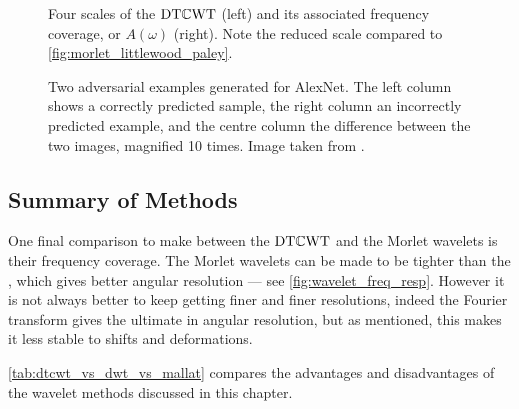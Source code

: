   \begin{figure}
    \subfloat{\makebox[0.6\textwidth][c]{%
    }}
    \subfloat{\makebox[0.4\textwidth][c]{%
    }}
    \caption[$\DTCWT$ basis functions and their frequency coverage]
    {Four scales of the $\DTCWT$ (left) and its associated frequency
    coverage, or $A(\omega)$ (right). Note the reduced scale compared to \autoref{fig:morlet_littlewood_paley}.}
    \label{fig:dtcwt_lwoodpaley}
  \end{figure}

  \begin{figure}
    \centering
    \caption[Two adversarial examples generated for AlexNet]
    {Two adversarial examples generated for AlexNet. The left column
    shows a correctly predicted sample, the right column an incorrectly
    predicted example, and the centre column the difference between the two
    images, magnified 10 times. Image taken from
    \citep{szegedy_intriguing_2013}.}
    \label{fig:difference}
  \end{figure}
\subsection{Summary of Methods}
  One final comparison to make between the $\DTCWT$ and the Morlet wavelets is
  their frequency coverage. The Morlet wavelets can be made to be tighter than
  the \DTCWT, which gives better angular resolution --- see
  \autoref{fig:wavelet_freq_resp}. However it is not always
  better to keep getting finer and finer resolutions, indeed the Fourier
  transform gives the ultimate in angular resolution, but as mentioned, this
  makes it less stable to shifts and deformations. 

  \autoref{tab:dtcwt_vs_dwt_vs_mallat} compares the advantages and
  disadvantages of the wavelet methods discussed in this chapter.

